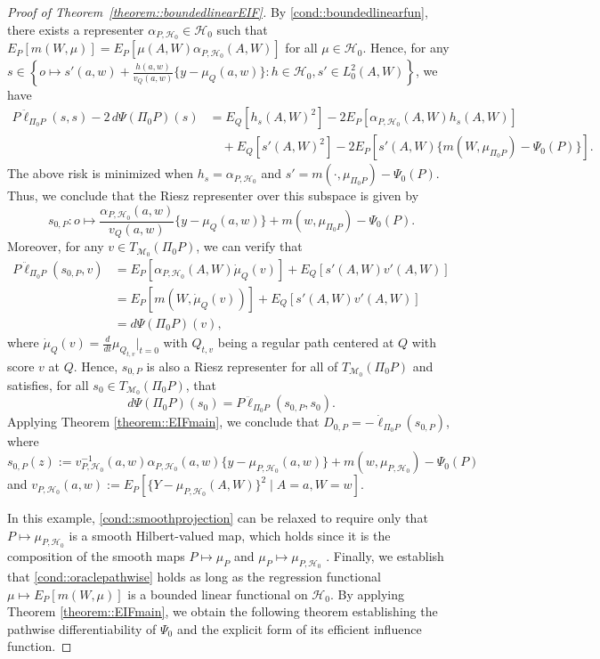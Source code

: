 \documentclass[11pt]{article}
\theoremstyle{definition}
\begin{document}
\begin{proof}[Proof of Theorem~\ref{theorem::boundedlinearEIF}]
By \ref{cond::boundedlinearfun}, there exists a representer $\alpha_{P, \mathcal{H}_0} \in \mathcal{H}_0$ such that $E_P[m(W,\mu)] = E_P[\mu(A,W)\alpha_{P, \mathcal{H}_0}(A,W)]$ for all $\mu \in \mathcal{H}_0$. Hence, for any $s \in \left\{ o \mapsto s'(a,w) + \frac{h(a,w)}{v_Q(a,w)}\{y - \mu_Q(a,w)\}: h \in \mathcal{H}_0, s' \in L^2_0(A,W) \right\}$, we have
\begin{align*}
     P\ddot{\ell}_{\Pi_0 P}(s,s) - 2\, d\Psi(\Pi_0 P)(s) &= E_Q[h_s(A,W)^2]   - 2E_P[\alpha_{P, \mathcal{H}_0}(A,W)h_s(A,W)] \\
     & \quad + E_Q[s'(A,W)^2]  - 2E_P[s'(A,W)\{m(W, \mu_{\Pi_0 P}) - \Psi_0(P)\}].
\end{align*}
The above risk is minimized when $h_s = \alpha_{P, \mathcal{H}_0}$ and $s' = m(\cdot, \mu_{\Pi_0 P}) - \Psi_0(P)$. Thus, we conclude that the Riesz representer over this subspace is given by
$$s_{0,P}: o \mapsto \frac{\alpha_{P, \mathcal{H}_0}(a,w)}{v_Q(a,w)}\{y - \mu_Q(a,w)\} +  m(w, \mu_{\Pi_0 P}) - \Psi_0(P). $$
Moreover, for any $v \in T_{\mathcal{M}_0}(\Pi_0 P)$, we can verify that
\begin{align*}
    P\ddot{\ell}_{\Pi_0 P}(s_{0,P},v) &= E_P[\alpha_{P, \mathcal{H}_0}(A,W)\dot{\mu}_{Q}(v)]   + E_Q[s'(A,W) v'(A,W)] \\
    & = E_P[m(W, \dot{\mu}_{Q}(v))]  + E_Q[s'(A,W) v'(A,W)] \\
    &= d\Psi(\Pi_0 P)(v),
\end{align*}
where $\dot{\mu}_{Q}(v) = \frac{d}{dt} \mu_{Q_{t,v}} \big |_{t=0}$ with $Q_{t,v}$ being a regular path centered at $Q$ with score $v$ at $Q$. Hence, $s_{0,P}$ is also a Riesz representer for all of $T_{\mathcal{M}_0}(\Pi_0 P)$ and satisfies, for all $s_0 \in T_{\mathcal{M}_0}(\Pi_0 P)$, that
$$d\Psi(\Pi_0 P)(s_0) =  P\ddot{\ell}_{\Pi_0 P}(s_{0,P},s_0). $$
Applying Theorem \ref{theorem::EIFmain}, we conclude that  $D_{0,P} = -\dot{\ell}_{\Pi_0 P}(s_{0,P})$, where $s_{0,P}(z) := v_{P,\mathcal{H}_0}^{-1}(a,w)\alpha_{P,\mathcal{H}_0}(a,w)\{y - \mu_{P,\mathcal{H}_0}(a,w)\} + m(w,\mu_{P,\mathcal{H}_0}) - \Psi_0(P)$ and $v_{P,\mathcal{H}_0}(a,w) := E_P[\{Y - \mu_{P,\mathcal{H}_0}(A,W)\}^2 \mid A = a, W = w]$.

 


 




 


 


In this example, \ref{cond::smoothprojection} can be relaxed to require only that $P \mapsto \mu_{P,\mathcal{H}_0}$ is a smooth Hilbert-valued map, which holds since it is the composition of the smooth maps $P \mapsto \mu_P$ and $\mu_P \mapsto \mu_{P,\mathcal{H}_0}$ \citep{luedtke2024one}. Finally, we establish that \ref{cond::oraclepathwise} holds as long as the regression functional $\mu \mapsto E_P[m(W,\mu)]$ is a bounded linear functional on $\mathcal{H}_0$. By applying Theorem \ref{theorem::EIFmain}, we obtain the following theorem establishing the pathwise differentiability of $\Psi_0$ and the explicit form of its efficient influence function.  
 

\end{proof}
\end{document}
